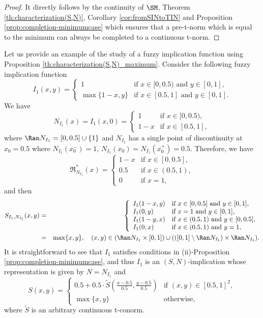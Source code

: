 \begin{proof}
	It directly follows by the continuity of $\SM$, Theorem \ref{th:characterization(S,N)}, Corollary \ref{cor:fromSINtoTIN} and  Proposition \ref{prop:completion-minimumcase} which ensures that a pre-t-norm which is equal to the minimum can always be completed to a continuous t-norm.
\end{proof}


\begin{example}\label{ex:non-continuous-completion} Let us provide an example of the study of a fuzzy implication function using Proposition \ref{th:characterization(S,N)_maximum}. Consider the following fuzzy implication function 
	$$
	I_1(x,y) =
	\left\{ \begin{array}{ll}
		1 &   \text{if }   x \in [0,0.5) \text{ and } y \in [0,1], \\
		\max\{1-x,y\}& \text{if } x \in [0.5,1] \text{ and } y \in [0,1].
	\end{array} \right.
	$$
	We have
	$$
	N_{I_1}(x) = I_1(x,0) =
	\left\{ \begin{array}{ll}
		1 &   \text{if }   x \in [0,0.5), \\
		1-x & \text{if } x \in [0.5,1],
	\end{array} \right.
	$$
	where $\Ran N_{I_1} = [0,0.5] \cup\{1\}$ and $N_{I_1}$ has a single point of discontinuity at $x_0 =0.5$ where $N_{I_1}(x_0^{-})=1$, $N_{I_1}(x_0)=N_{I_1}(x_0^{+})=0.5$. Therefore, we have
	$$
	\mathfrak{R}^*_{N_{I_1}}(x) =
	\left\{ \begin{array}{ll}
		1-x &   \text{if }   x \in [0,0.5], \\
		0.5 &   \text{if }   x \in (0.5,1), \\
		0 &   \text{if }   x=1,
	\end{array} \right.
	$$
	and then
	\begin{eqnarray*}
		S_{I_1,N_{I_1}}(x,y) 
		&=& 
		\left\{ \begin{array}{ll}
			I_1(1-x,y) &   \text{if }   x \in [0,0.5] \text{ and } y \in [0,1], \\
			I_1(0,y) &   \text{if }   x =1 \text{ and } y \in [0,1], \\
			I_1(1-y,x) &   \text{if }   x \in (0.5,1) \text{ and } y \in [0,0.5], \\
			I_1(0,x) &   \text{if }   x \in (0.5,1) \text{ and } y =1,
		\end{array} \right. \\
		&=&
		\max\{x,y\}, \quad (x,y) \in (\Ran N_{I_1} \times [0,1]) \cup (([0,1] \setminus \Ran N_{I_1}) \times \Ran N_{I_1}) .
	\end{eqnarray*}
	It is straightforward to see that $I_1$ satisfies conditions in (ii)-Proposition \ref{prop:completion-minimumcase}, and thus $I_1$ is an $(S,N)$-implication whose representation is given by $N=N_{I_1}$ and
	$$
	S(x,y) =
	\left\{ \begin{array}{ll}
		0.5+0.5\cdot \tilde{S}\left(\frac{x-0.5}{0.5},\frac{y-0.5}{0.5}\right) &   \text{if }   (x,y) \in [0.5,1]^2, \\
		\max\{x,y\} & \text{otherwise,}
	\end{array} \right.
	$$
	where $\tilde{S}$ is an arbitrary continuous t-conorm. 
\end{example}

